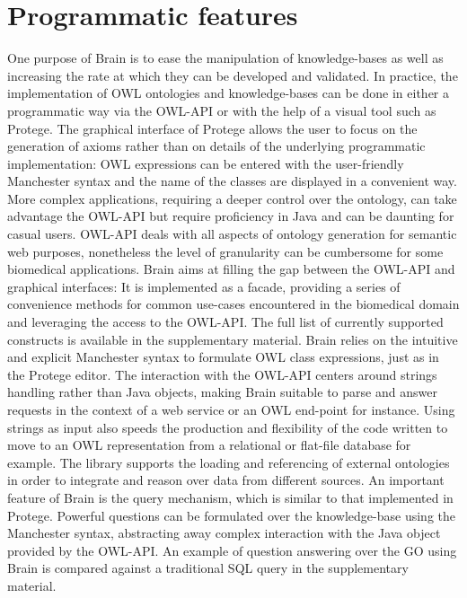 \documentclass{bioinfo}
\begin{document}
\section{Programmatic features}
One purpose of Brain is to ease the manipulation of knowledge-bases as well as increasing the rate at
which they can be developed and validated.
In practice, the implementation of OWL ontologies and knowledge-bases can be done in either a programmatic way
via the OWL-API or with the
help of a visual tool such as Protege.
The graphical interface of Protege allows the user to focus
on the generation of axioms rather than on details of the underlying programmatic implementation:
OWL expressions can be entered
with the user-friendly Manchester syntax \citep{Horridge2006} and the name of the classes are displayed in a convenient way.
More complex applications, requiring a deeper control over the ontology,
can take advantage the OWL-API but require proficiency in Java and can be daunting for casual users.
OWL-API deals with all aspects of ontology generation for semantic web purposes, nonetheless the
level of granularity can be cumbersome for some biomedical applications. Brain aims at filling the gap between the OWL-API
and graphical interfaces: It is implemented as a facade, providing a series of convenience methods for common
use-cases encountered in the biomedical domain and leveraging the access to the OWL-API.
The full list of currently supported constructs is available in the supplementary material.
Brain relies on the intuitive and explicit Manchester syntax to formulate OWL class expressions, just as in the Protege editor.
The interaction with the OWL-API centers around strings handling rather than Java objects, making Brain suitable to parse and answer requests in
the context of a web service or an OWL end-point for instance. Using strings as input also speeds the production
and flexibility of the code written to move to an OWL representation from a relational or flat-file database for example.
The library supports the loading and referencing of external ontologies in order to integrate and reason
over data from different sources. An important feature of Brain is the query mechanism, which is similar to
that implemented in Protege. Powerful questions can be formulated over the knowledge-base using the Manchester syntax, abstracting
away complex interaction with the Java object provided by the OWL-API. An example of question answering over the GO using Brain
is compared against a traditional SQL query in the supplementary material.
\end{document}
